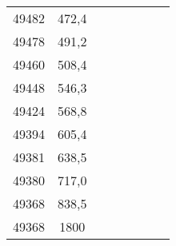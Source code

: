 \documentclass[11pt]{article}
\begin{document}
{{\begin{tabular}{|c|c|c|c|c|c|c|c|}
            49482 & 472,4 &  & \multicolumn{1}{c}{} & \multicolumn{1}{c}{} & \multicolumn{1}{c}{} &  & \tabularnewline
            \cline{1-2} 
            49478 & 491,2 &  & \multicolumn{1}{c}{} & \multicolumn{1}{c}{} & \multicolumn{1}{c}{} &  & \tabularnewline
            \cline{1-2} 
            49460 & 508,4 &  & \multicolumn{1}{c}{} & \multicolumn{1}{c}{} & \multicolumn{1}{c}{} &  & \tabularnewline
            \cline{1-2} 
            49448 & 546,3 &  & \multicolumn{1}{c}{} & \multicolumn{1}{c}{} & \multicolumn{1}{c}{} &  & \tabularnewline
            \cline{1-2} 
            49424 & 568,8 &  & \multicolumn{1}{c}{} & \multicolumn{1}{c}{} & \multicolumn{1}{c}{} &  & \tabularnewline
            \cline{1-2} 
            49394 & 605,4 &  & \multicolumn{1}{c}{} & \multicolumn{1}{c}{} & \multicolumn{1}{c}{} &  & \tabularnewline
            \cline{1-2} 
            49381 & 638,5 &  & \multicolumn{1}{c}{} & \multicolumn{1}{c}{} & \multicolumn{1}{c}{} &  & \tabularnewline
            \cline{1-2} 
            49380 & 717,0 &  & \multicolumn{1}{c}{} & \multicolumn{1}{c}{} & \multicolumn{1}{c}{} &  & \tabularnewline
            \cline{1-2} 
            49368 & 838,5 &  & \multicolumn{1}{c}{} & \multicolumn{1}{c}{} & \multicolumn{1}{c}{} &  & \tabularnewline
            \cline{1-2} 
            49368 & 1800 &  & \multicolumn{1}{c}{} & \multicolumn{1}{c}{} & \multicolumn{1}{c}{} &  & \tabularnewline
            \cline{1-2} 
        \end{tabular}
    }
}
\vspace*{\fill}
\end{document}
